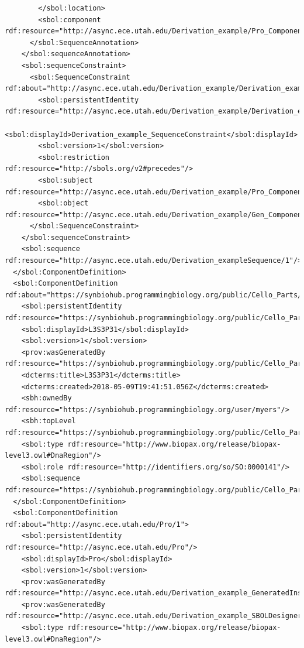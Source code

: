 \begin{lstlisting}
        </sbol:location>
        <sbol:component rdf:resource="http://async.ece.utah.edu/Derivation_example/Pro_Component/1"/>
      </sbol:SequenceAnnotation>
    </sbol:sequenceAnnotation>
    <sbol:sequenceConstraint>
      <sbol:SequenceConstraint rdf:about="http://async.ece.utah.edu/Derivation_example/Derivation_example_SequenceConstraint/1">
        <sbol:persistentIdentity rdf:resource="http://async.ece.utah.edu/Derivation_example/Derivation_example_SequenceConstraint"/>
        <sbol:displayId>Derivation_example_SequenceConstraint</sbol:displayId>
        <sbol:version>1</sbol:version>
        <sbol:restriction rdf:resource="http://sbols.org/v2#precedes"/>
        <sbol:subject rdf:resource="http://async.ece.utah.edu/Derivation_example/Pro_Component/1"/>
        <sbol:object rdf:resource="http://async.ece.utah.edu/Derivation_example/Gen_Component/1"/>
      </sbol:SequenceConstraint>
    </sbol:sequenceConstraint>
    <sbol:sequence rdf:resource="http://async.ece.utah.edu/Derivation_exampleSequence/1"/>
  </sbol:ComponentDefinition>
  <sbol:ComponentDefinition rdf:about="https://synbiohub.programmingbiology.org/public/Cello_Parts/L3S3P31/1">
    <sbol:persistentIdentity rdf:resource="https://synbiohub.programmingbiology.org/public/Cello_Parts/L3S3P31"/>
    <sbol:displayId>L3S3P31</sbol:displayId>
    <sbol:version>1</sbol:version>
    <prov:wasGeneratedBy rdf:resource="https://synbiohub.programmingbiology.org/public/Cello_Parts/CelloUCF2sbol_Activity/1"/>
    <dcterms:title>L3S3P31</dcterms:title>
    <dcterms:created>2018-05-09T19:41:51.056Z</dcterms:created>
    <sbh:ownedBy rdf:resource="https://synbiohub.programmingbiology.org/user/myers"/>
    <sbh:topLevel rdf:resource="https://synbiohub.programmingbiology.org/public/Cello_Parts/L3S3P31/1"/>
    <sbol:type rdf:resource="http://www.biopax.org/release/biopax-level3.owl#DnaRegion"/>
    <sbol:role rdf:resource="http://identifiers.org/so/SO:0000141"/>
    <sbol:sequence rdf:resource="https://synbiohub.programmingbiology.org/public/Cello_Parts/L3S3P31_sequence/1"/>
  </sbol:ComponentDefinition>
  <sbol:ComponentDefinition rdf:about="http://async.ece.utah.edu/Pro/1">
    <sbol:persistentIdentity rdf:resource="http://async.ece.utah.edu/Pro"/>
    <sbol:displayId>Pro</sbol:displayId>
    <sbol:version>1</sbol:version>
    <prov:wasGeneratedBy rdf:resource="http://async.ece.utah.edu/Derivation_example_GeneratedInstance21_SBOLDesignerActivity/1"/>
    <prov:wasGeneratedBy rdf:resource="http://async.ece.utah.edu/Derivation_example_SBOLDesignerActivity/1"/>
    <sbol:type rdf:resource="http://www.biopax.org/release/biopax-level3.owl#DnaRegion"/>

\end{lstlisting}
